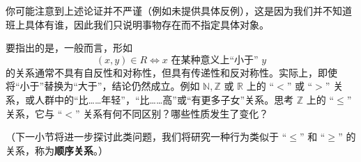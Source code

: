 你可能注意到上述论证并不严谨（例如未提供具体反例），这是因为我们并不知道班上具体有谁，因此我们只说明事物存在而不指定具体对象。

要指出的是，一般而言，形如
\[(x, y) \in R \iff x \text{\ 在某种意义上``小于''\ } y\]
的关系通常不具有自反性和对称性，但具有传递性和反对称性。实际上，即使将``小于''替换为``大于''，结论仍然成立。例如 $\mathbb{N}, \mathbb{Z}$ 或 $\mathbb{R}$ 上的 ``$<$'' 或 ``$>$'' 关系，或人群中的``比……年轻''，``比……高''或``有更多子女''关系。思考 $\mathbb{Z}$ 上的 ``$\le$'' 关系，它与 ``$<$'' 关系有何不同区别？哪些性质发生了变化？

（下一小节将进一步探讨此类问题，我们将研究一种行为类似于 ``$\le$'' 和 ``$\ge$'' 的关系，称为\textbf{顺序关系}。）
